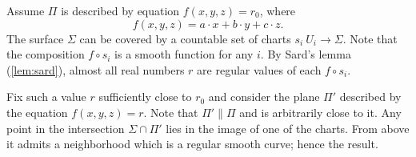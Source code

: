 Assume $\Pi$ is described by equation $f(x,y,z)=r_0$, where
\[f(x,y,z)=a\cdot x+b\cdot y+c\cdot z.\] 
The surface $\Sigma$ can be covered by a countable set of charts $s_i\:U_i\to \Sigma$.
Note that the composition $f\circ s_i$ is a smooth function for any $i$.
By Sard's lemma (\ref{lem:sard}), almost all real numbers $r$ are regular values of each $f\circ s_i$.

Fix such a value $r$ sufficiently close to $r_0$ and consider the plane $\Pi'$ described by the equation $f(x,y,z)=r$.
Note that $\Pi'\parallel \Pi$ and is arbitrarily close to it.
Any point in the intersection $\Sigma\cap\Pi'$ lies in the image of one of the charts.
From above it admits a neighborhood which is a regular smooth curve;
hence the result.\qeds


